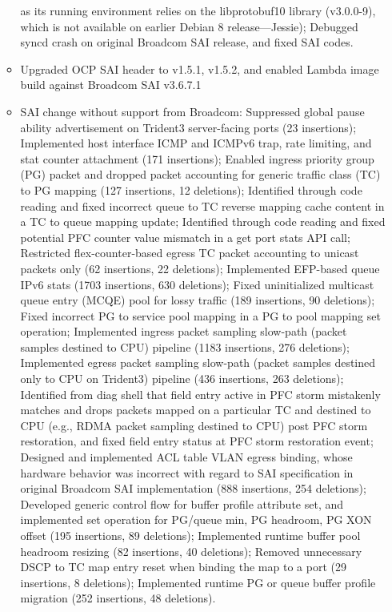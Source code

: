 \documentclass[letterpaper,11pt]{article}
\newcommand{\resitem}[1]{\item #1 \vspace{-2pt}}
\begin{document}
\begin{itemize}
\begin{itemize}
{  as its running environment relies on the libprotobuf10 library (v3.0.0-9), which is not available on earlier Debian 8 release---Jessie);
  Debugged syncd crash on original Broadcom SAI release, and fixed SAI codes.}
  \resitem{Upgraded OCP SAI header to v1.5.1, v1.5.2, and enabled Lambda image build against Broadcom SAI v3.6.7.1}
  \resitem{SAI change without support from Broadcom: Suppressed global pause ability advertisement on Trident3 server-facing ports (23 insertions);
  Implemented host interface ICMP and ICMPv6 trap, rate limiting, and stat counter attachment (171 insertions);
  Enabled ingress priority group (PG) packet and dropped packet accounting for generic traffic class (TC) to PG mapping (127 insertions, 12 deletions);
  Identified through code reading and fixed incorrect queue to TC reverse mapping cache content in a TC to queue mapping update;
  Identified through code reading and fixed potential PFC counter value mismatch in a get port stats API call;
  Restricted flex-counter-based egress TC packet accounting to unicast packets only (62 insertions, 22 deletions);
  Implemented EFP-based queue IPv6 stats (1703 insertions, 630 deletions);
  Fixed uninitialized multicast queue entry (MCQE) pool for lossy traffic (189 insertions, 90 deletions);
  Fixed incorrect PG to service pool mapping in a PG to pool mapping set operation;
  Implemented ingress packet sampling slow-path (packet samples destined to CPU) pipeline (1183 insertions, 276 deletions);
  Implemented egress packet sampling slow-path (packet samples destined only to CPU on Trident3) pipeline (436 insertions, 263 deletions);
  Identified from diag shell that field entry active in PFC storm mistakenly matches and drops packets
  mapped on a particular TC and destined to CPU (e.g., RDMA packet sampling destined to CPU) post PFC storm restoration,
  and fixed field entry status at PFC storm restoration event;
  Designed and implemented ACL table VLAN egress binding, whose hardware behavior was incorrect
  with regard to SAI specification in original Broadcom SAI implementation (888 insertions, 254 deletions);
  Developed generic control flow for buffer profile attribute set,
  and implemented set operation for PG/queue min, PG headroom, PG XON offset (195 insertions, 89 deletions);
  Implemented runtime buffer pool headroom resizing (82 insertions, 40 deletions);
  Removed unnecessary DSCP to TC map entry reset when binding the map to a port (29 insertions, 8 deletions);
  Implemented runtime PG or queue buffer profile migration (252 insertions, 48 deletions).
}
\end{itemize}
\end{itemize}
\end{document}
